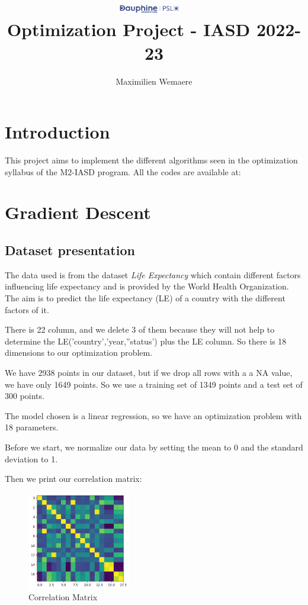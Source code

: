 \documentclass{article}
\title{%
\includegraphics[width=0.2\textwidth]{dauphine.png}~ 
\\[0.3cm]
Optimization Project - IASD 2022-23 \\ }
\author{Maximilien Wemaere}
\date{}
\begin{document}
\maketitle

\section*{Introduction}

This project aims to implement the different algorithms seen in the optimization syllabus of the M2-IASD program. All the codes are available at: %

\section{Gradient Descent}

\subsection{Dataset presentation}
    The data used is from the dataset \textit{Life Expectancy} which contain different factors influencing life expectancy and is provided by the World Health Organization. The aim is to predict the life expectancy (LE) of a country with the different factors of it.
    
    There is 22 column, and we delete 3 of them because they will not help to determine the LE('country','year,''status') plus the LE column. So there is 18 dimensions to our optimization problem. 

    We have 2938 points in our dataset, but if we drop all rows with a a NA value, we have only 1649 points. So we use a training set of 1349 points and a test set of 300 points.

    The model chosen is a linear regression, so we have an optimization problem with 18 parameters.

    Before we start, we normalize our data by setting the mean to 0 and the standard deviation to 1.

    Then we print our correlation matrix: 

    \begin{figure}[!h]
    \centering
    \includegraphics[width=0.4\textwidth]{images/corr.png}
    \caption{Correlation Matrix}
    \label{fig:res}
    \end{figure}
\end{document}
